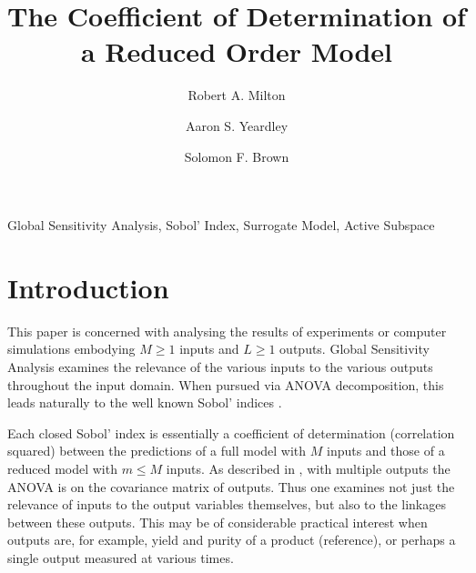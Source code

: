 \documentclass[preprint,12pt]{elsarticle}
\begin{document}
\begin{frontmatter}

    \title{The Coefficient of Determination of a Reduced Order Model}

    \author{Robert A. Milton}

    \author{Aaron S. Yeardley}

    
    \author{Solomon F. Brown}
    
    \address{Department of Chemical and Biological Engineering, University of Sheffield, Sheffield, S1 3JD, United Kingdom}       

    \begin{abstract}
    \end{abstract}

    \begin{keyword}
        Global Sensitivity Analysis, Sobol' Index, Surrogate Model, Active Subspace
    \end{keyword}

\end{frontmatter}

\section{Introduction}\label{sec:Intro}
This paper is concerned with analysing the results of experiments or computer simulations embodying $M\geq 1$ inputs and $L\geq 1$ outputs. Global Sensitivity Analysis \cite{Razavi2021} examines the relevance of the various inputs to the various outputs throughout the input domain. When pursued via ANOVA decomposition, this leads naturally to the well known Sobol' indices \cite{Sobol2001}.

Each closed Sobol' index is essentially a coefficient of determination (correlation squared) between the predictions of a full model with $M$ inputs and those of a reduced model with $m\leq M$ inputs. As described in \cite{Gamboa.etal2013}, with multiple outputs the ANOVA is on the covariance matrix of outputs. Thus one examines not just the relevance of inputs to the output variables themselves, but also to the linkages between these outputs. This may be of considerable practical interest when outputs are, for example, yield and purity of a product (reference), or perhaps a single output measured at various times.
\end{document}
